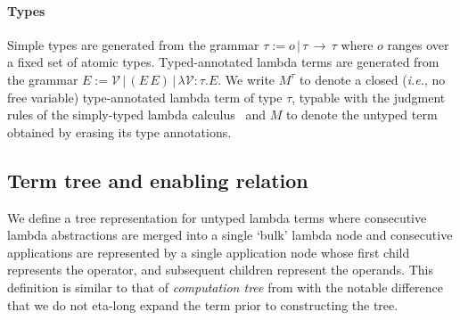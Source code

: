 \documentclass[xchauthor,chkrefs,GCNS,amsmath,amsthm,rotating,leaveRGB]{tcsg}
\theoremstyle{plain}
\theoremstyle{definition}
\newcommand{\VarSet}{\mathcal{V}}
\begin{document}
\paragraph*{Types}
Simple types are generated from the grammar $\tau := o\,|\,\tau \,\rightarrow
\,\tau $ where $o$ ranges over a fixed set of atomic types. Typed-annotated
lambda terms are generated from the grammar $E := \VarSet \, |\, (E\, E)\,
|\, \lambda \VarSet \colon \tau . E $. We write $M^\tau $ to denote a closed
(\textit{i.e.}, no free variable) type-annotated lambda term of type $\tau $,
typable with the judgment rules of the simply-typed lambda
calculus~\cite{Barendregt84} and $M$ to denote the untyped term obtained by
erasing its type annotations.

\subsection{Term tree and enabling relation}\label{sec2.3}

We define a tree representation for untyped lambda terms where consecutive
lambda abstractions are merged into a single `bulk' lambda node and
consecutive applications are represented by a single application node whose
first child represents the operator, and subsequent children represent the
operands. This definition is similar to that of \emph{computation tree} from
\cite{OngLics2006,BlumPhd} with the notable difference that we do not
eta-long expand the term prior to constructing the tree.
\end{document}
